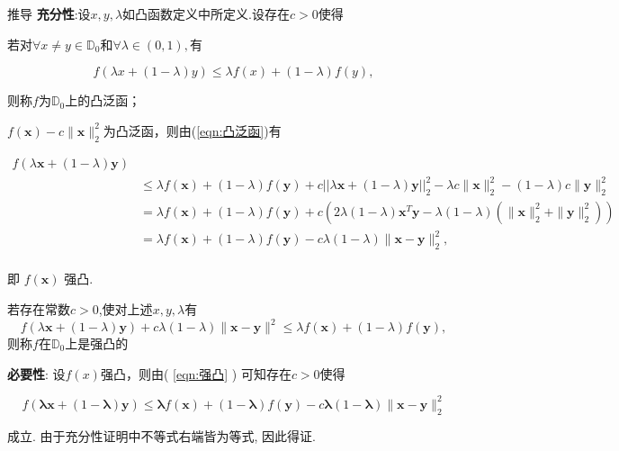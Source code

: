 \documentclass{lzureport}
\begin{document}
\begin{derivation}{推导}
\textbf{充分性}:设$x,y,\lambda$如凸函数定义中所定义.设存在$c>0$使得

\begin{Thm}[凸泛函定义]
	若对$\forall x\neq y\in\mathbb{D}_0$和$\forall \lambda \in ( 0, 1) , \textbf{有 }$

	\begin{equation}
	f(\lambda x+(1-\lambda)y)\leqslant\lambda f(x)+(1-\lambda)f(y),
	\end{equation}\label{eqn:凸泛函}

则称$f$为$\mathbb{D}_0$上的凸泛函；
\end{Thm}


$f(\boldsymbol{x})-c\|\boldsymbol{x}\|_2^2$为凸泛函，则由(\ref{eqn:凸泛函})有

$$\begin{aligned}
f(\lambda\boldsymbol{x}+(1-\lambda)\boldsymbol{y})\\
&\leq\lambda f(\boldsymbol{x})+(1-\lambda)f(\boldsymbol{y})+c||\lambda\boldsymbol{x}+(1-\lambda)\boldsymbol{y}||_2^2-\lambda c\|\boldsymbol{x}\|_2^2-(1-\lambda)c\|\boldsymbol{y}\|_2^2\\
&=\lambda f(\boldsymbol{x})+(1-\lambda)f(\boldsymbol{y})+c(2\lambda(1-\lambda)\boldsymbol{x}^T\boldsymbol{y}-\lambda(1-\lambda)(\|\boldsymbol{x}\|_2^2+\|\boldsymbol{y}\|_2^2))\\
&=\lambda f(\boldsymbol{x})+(1-\lambda)f(\boldsymbol{y})-c\lambda(1-\lambda)\|\boldsymbol{x}-\boldsymbol{y}\|_2^2,\\
\end{aligned}$$

即 $f(\boldsymbol{x})$ 强凸.

\begin{Thm}[强凸定义]
	若存在常数$c>0$,使对上述$x,y,\lambda$有
	\begin{equation}
	f(\lambda\boldsymbol{x}+(1-\lambda)\boldsymbol{y})+c\lambda(1-\lambda)\|\boldsymbol{x}-\boldsymbol{y}\|^2\leqslant\lambda f(\boldsymbol{x})+(1-\lambda)f(\boldsymbol{y}),
	\end{equation}\label{eqn:强凸}
则称$f$在$\mathbb{D}_0$上是强凸的
\end{Thm}

\textbf{必要性}: 设$f(x)$强凸，则由( \ref{eqn:强凸} ) 可知存在$c> 0$使得

$$f(\boldsymbol{\lambda}\boldsymbol{x}+(1-\boldsymbol{\lambda})\boldsymbol{y})\leq\boldsymbol{\lambda}f(\boldsymbol{x})+(1-\boldsymbol{\lambda})f(\boldsymbol{y})-c\boldsymbol{\lambda}\left(1-\boldsymbol{\lambda}\right)\|\boldsymbol{x}-\boldsymbol{y}\|_2^2$$

成立. 由于充分性证明中不等式右端皆为等式, 因此得证.
\end{derivation}
\end{document}
